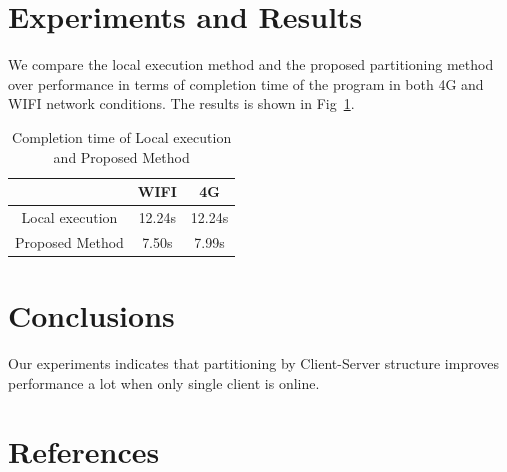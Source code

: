 \documentclass[a4paper,11pt,onecolumn,twoside]{article}
\begin{document}
\begin{CJK*}{GBK}{song}
\section{Experiments and Results}

We compare the local execution method and the proposed 
partitioning method 
over performance in terms of completion time of the program
in both 4G and WIFI network conditions. 
The results is shown in Fig~\ref{tb:result}. 

\begin{table}[!hbt]
  \caption{Completion time of Local execution and Proposed Method}
  \centering\label{tb:result}
  \begin{tabular}{|c|c|c|}
  \hline
                                       & WIFI                & 4G              \\ \hline
  Local execution                      &  12.24s             &  12.24s         \\ \hline
  Proposed Method                     &  7.50s              &  7.99s          \\ \hline
  \end{tabular}
  \end{table}

\section{Conclusions}

Our experiments indicates that partitioning by Client-Server structure improves performance a lot when only single client is online.

\section{References}

\nocite{1508.06576}
\nocite{tensorflow2015-whitepaper}


 




\end{CJK*}
\end{document}
